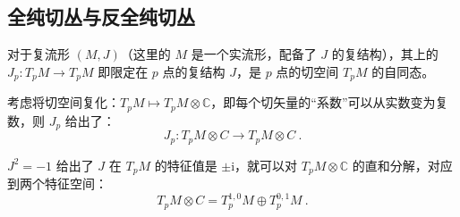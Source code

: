 

\subsection{全纯切丛与反全纯切丛}
对于复流形 $(M, J)$（这里的 $M$ 是一个实流形，配备了 $J$ 的复结构），其上的 $J_p: T_p M \to T_p M$ 即限定在 $p$ 点的复结构 $J$，是 $p$ 点的切空间 $T_p M$ 的自同态。

考虑将切空间复化：$T_p M \mapsto T_p M \otimes \mathbb C$，即每个切矢量的“系数”可以从实数变为复数，则 $J_p$ 给出了：
\begin{equation}
J_p : T_p M \otimes C \to T_p M \otimes C ~.
\end{equation}

$J^2 = -1$ 给出了 $J$ 在 $T_p M$ 的特征值是 $\pm \mathrm i$，就可以对 $T_p M \otimes \mathbb C$ 的直和分解，对应到两个特征空间：
\begin{equation}
T_p M \otimes C = T_p^{1, 0} M \oplus T_p^{0, 1} M ~.
\end{equation}
 
